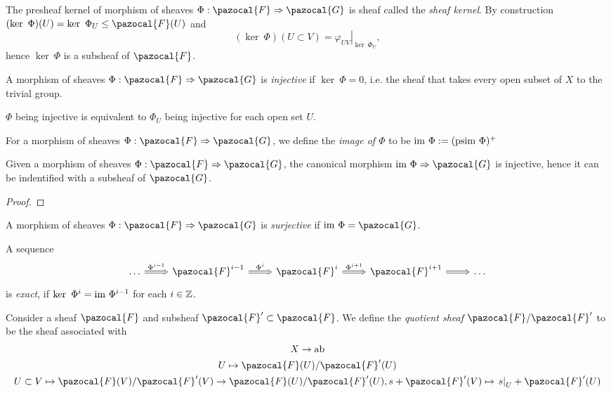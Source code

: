 \begin{example}
    The presheaf kernel of morphism of sheaves $\Phi:\pazocal{F}\Rightarrow \pazocal{G}$ is sheaf called the \emph{sheaf kernel}. By construction $(\ker \ \Phi)(U) = \ker \ \Phi_U \leq \pazocal{F}(U)$ and 
    $$(\ker \ \Phi)(U\subset V) = \left. \varphi_{UV}\right|_{\ker\ \Phi_U},$$
    hence $\ker \ \Phi$ is a subsheaf of $\pazocal{F}$. 
\end{example}
\begin{definition}
    A morphism of sheaves $\Phi:\pazocal{F}\Rightarrow \pazocal{G}$ is \emph{injective} if $\ker \ \Phi=0$, i.e. the sheaf that takes every open subset of $X$ to the trivial group.
\end{definition}
\begin{remark}
    $\Phi$ being injective is equivalent to $\Phi_U$ being injective for each open set $U$. 
\end{remark}
\begin{definition}
    For a morphism of sheaves $\Phi: \pazocal{F}\Rightarrow \pazocal{G}$, we define the \emph{image of $\Phi$} to be $\im \ \Phi:= (\mathrm{psim}\ \Phi)^{+}$
\end{definition}
\begin{proposition}
    Given a morphism of sheaves $\Phi:\pazocal{F}\Rightarrow \pazocal{G}$, the canonical morphism $\im\ \Phi\Rightarrow \pazocal{G}$ is injective, hence it can be indentified with a subsheaf of $\pazocal{G}$. 
\end{proposition}
\begin{proof}
    
\end{proof}
\begin{definition}
    A morphism of sheaves $\Phi:\pazocal{F}\Rightarrow \pazocal{G}$ is \emph{surjective} if $\im\ \Phi = \pazocal{G}$.
\end{definition}
\begin{definition}
    A sequence 
    $$
        \begin{tikzcd}
            \dots \arrow[r, Rightarrow, "\Phi^{i-1}"] & \pazocal{F}^{i-1} \arrow[r, Rightarrow, "\Phi^i"] & \pazocal{F}^i \arrow[r, Rightarrow, "\Phi^{i+1}"] & \pazocal{F}^{i+1} \arrow[r, Rightarrow] & \dots
        \end{tikzcd}
    $$
    is \emph{exact}, if $\ker\ \Phi^i = \mathrm{im} \ \Phi^{i-1}$ for each $i \in \mathbb{Z}$. 
\end{definition}
\begin{definition}
    Consider a sheaf $\pazocal{F}$ and subsheaf $\pazocal{F}'\subset \pazocal{F}$. We define the \emph{quotient sheaf $\pazocal{F}/\pazocal{F}'$} to be the sheaf associated with 
    \begin{gather*}
        X\rightarrow \mathrm{ab}\\
        U\mapsto \pazocal{F}(U)/\pazocal{F}'(U)\\
        U\subset V \mapsto \pazocal{F}(V)/\pazocal{F}'(V) \rightarrow \pazocal{F}(U)/\pazocal{F}'(U), s + \pazocal{F}'(V) \mapsto \left. s\right|_{U}+\pazocal{F}'(U)
    \end{gather*}
\end{definition}
